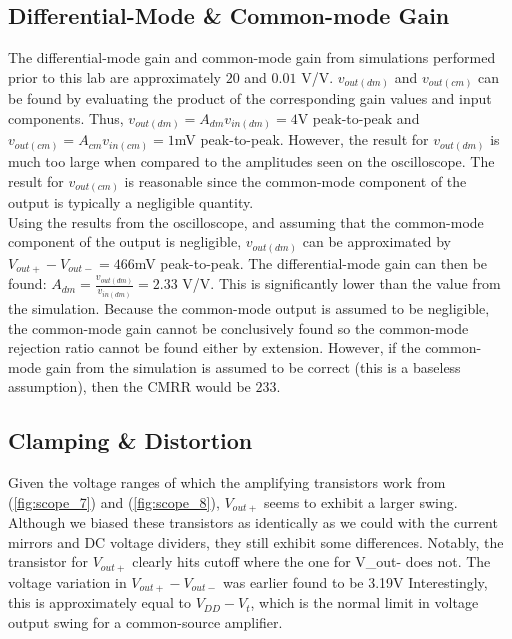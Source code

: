 \subsection{Differential-Mode \& Common-mode Gain}

The differential-mode gain and common-mode gain from simulations performed prior to this lab are approximately $20$ and $0.01$ \si{\volt}/\si{\volt}.
$v_{out(dm)}$ and $v_{out(cm)}$ can be found by evaluating the product of the corresponding gain values and input components.
Thus, $v_{out(dm)} = A_{dm}v_{in(dm)} = 4$\si{\volt} peak-to-peak and $v_{out(cm)} = A_{cm}v_{in(cm)} = 1$\si{\milli\volt} peak-to-peak.
However, the result for $v_{out(dm)}$ is much too large when compared to the amplitudes seen on the oscilloscope.
The result for $v_{out(cm)}$ is reasonable since the common-mode component of the output is typically a negligible quantity. \\

Using the results from the oscilloscope, and assuming that the common-mode component of the output is negligible, $v_{out(dm)}$ can be approximated by $V_{out+} - V_{out-} = 466$\si{\milli\volt} peak-to-peak.
The differential-mode gain can then be found: $A_{dm} = \frac{v_{out(dm)}}{v_{in(dm)}} = 2.33$ \si{\volt}/\si{\volt}.
This is significantly lower than the value from the simulation.
Because the common-mode output is assumed to be negligible, the common-mode gain cannot be conclusively found so the common-mode rejection ratio cannot be found either by extension.
However, if the common-mode gain from the simulation is assumed to be correct (this is a baseless assumption), then the CMRR would be $233$. \\

\subsection{Clamping \& Distortion}

Given the voltage ranges of which the amplifying transistors work from (\ref{fig:scope_7}) and (\ref{fig:scope_8}), $V_{out+}$ seems to exhibit a larger swing.
Although we biased these transistors as identically as we could with the current mirrors and DC voltage dividers, they still exhibit some differences.
Notably, the transistor for $V_{out+}$ clearly hits cutoff where the one for V_{out-} does not.
The voltage variation in $V_{out+} - V_{out-}$ was earlier found to be 3.19\si{\volt}
Interestingly, this is approximately equal to $V_{DD} - V_{t}$, which is the normal limit in voltage output swing for a common-source amplifier.

